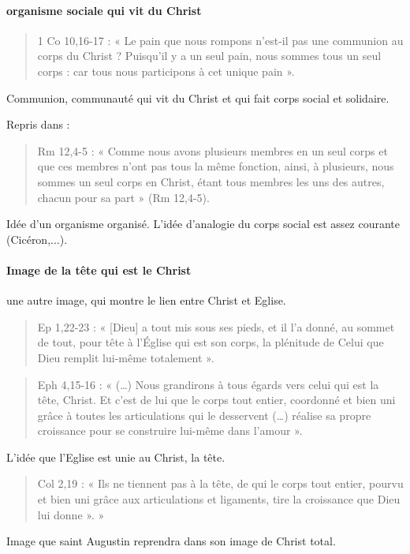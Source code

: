  \paragraph{organisme sociale qui vit du Christ}
\begin{quote}
     1 Co 10,16-17 : « Le pain que nous rompons n’est-il pas une communion au corps du Christ ? Puisqu’il y a un seul pain, nous sommes tous un seul corps : car tous nous participons à cet unique pain ».  
 \end{quote}
 
 Communion, communauté qui vit du Christ et qui fait corps social et solidaire.
 
 Repris dans : 

 
 \begin{quote}
     

Rm 12,4-5 : « Comme nous avons plusieurs membres en un seul corps et que ces membres n’ont pas tous la même fonction, ainsi, à plusieurs, nous sommes un seul corps en Christ, étant tous membres les uns des autres, chacun pour sa part » (Rm 12,4-5).  
 \end{quote}
 
 Idée d'un organisme organisé. 
 L'idée d'analogie du corps social est assez courante (Cicéron,...). 
 
 \paragraph{Image de la tête qui est le Christ} une autre image, qui montre le lien entre Christ et Eglise.
 
 \begin{quote}
     Ep 1,22-23 : « [Dieu] a tout mis sous ses pieds, et il l’a donné, au sommet de tout, pour tête à l’Église qui est son corps, la plénitude de Celui que Dieu remplit lui-même totalement ». 
 \end{quote}
 \begin{quote}
     Eph 4,15-16 : « (…) Nous grandirons à tous égards vers celui qui est la tête, Christ. Et c’est de lui que le corps tout entier, coordonné et bien uni grâce à toutes les articulations qui le desservent (…) réalise sa propre croissance pour se construire lui-même dans l’amour ». 
 \end{quote}
 L'idée que l'Eglise est unie au Christ, la tête.
 
 \begin{quote}
     Col 2,19 : « Ils ne tiennent pas à la tête, de qui le corps tout entier, pourvu et bien uni grâce aux articulations et ligaments, tire la croissance que Dieu lui donne ».  » 
 \end{quote}
 Image que saint Augustin reprendra dans son image de Christ total.
 
